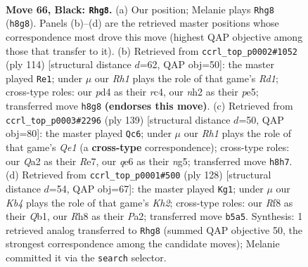 \documentclass[11pt]{article}
\begin{document}
\clearpage

\begin{figure}[p]\centering
\begin{subfigure}{0.46\textwidth}\centering
\resizebox{\linewidth}{!}{%
\newchessgame
\chessboard[
  setfen={5r1r/p5p1/4Q2p/1k1p3P/p2P2P1/4P2K/q6N/4b3 b - - 41 66},
  showmover=false,
  pgfstyle=straightmove, color=movearrow, markmove={h8-g8}
]}
\caption{}
\end{subfigure}\hfill
\begin{subfigure}{0.46\textwidth}\centering
\resizebox{\linewidth}{!}{%
\newchessgame
\chessboard[
  setfen={8/5pk1/3q2p1/3Pp2p/2r5/4QP1P/6P1/3R3K w - - 18 58},
  showmover=false,
  pgfstyle=straightmove, color=movearrow, markmove={d1-e1}
]}
\caption{}
\end{subfigure}
\\[4pt]
\begin{subfigure}{0.46\textwidth}\centering
\resizebox{\linewidth}{!}{%
\newchessgame
\chessboard[
  setfen={4q1k1/4r3/4p3/1p2QpN1/p6P/P2P2P1/1P3P1K/8 b - - 28 70},
  showmover=false,
  pgfstyle=straightmove, color=movearrow, markmove={e8-c6}
]}
\caption{}
\end{subfigure}\hfill
\begin{subfigure}{0.46\textwidth}\centering
\resizebox{\linewidth}{!}{%
\newchessgame
\chessboard[
  setfen={8/1r3pk1/1P4p1/2q4p/3p3P/pR4P1/P4P1K/1Q6 w - - 15 65},
  showmover=false,
  pgfstyle=straightmove, color=movearrow, markmove={h2-g1}
]}
\caption{}
\end{subfigure}
\caption{\textbf{Move 66, Black: \texttt{Rhg8}.} (a) Our position; Melanie plays \texttt{Rhg8} (\texttt{h8g8}). Panels (b)--(d) are the retrieved master positions whose correspondence most drove this move (highest QAP objective among those that transfer to it). (b) Retrieved from \texttt{ccrl\_top\_p0002\#1052} (ply 114) [structural distance $d$=62, QAP obj=50]: the master played \texttt{Re1}; under $\mu$ our \emph{Rh1} plays the role of that game's \emph{Rd1}; cross-type roles: our \emph{p}d4 as their \emph{r}c4, our \emph{n}h2 as their \emph{p}e5; transferred move \texttt{h8g8} \textbf{(endorses this move)}. (c) Retrieved from \texttt{ccrl\_top\_p0003\#2296} (ply 139) [structural distance $d$=50, QAP obj=80]: the master played \texttt{Qc6}; under $\mu$ our \emph{Rh1} plays the role of that game's \emph{Qe1} (a \textbf{cross-type} correspondence); cross-type roles: our \emph{Q}a2 as their \emph{R}e7, our \emph{q}e6 as their \emph{n}g5; transferred move \texttt{h8h7}. (d) Retrieved from \texttt{ccrl\_top\_p0001\#500} (ply 128) [structural distance $d$=54, QAP obj=67]: the master played \texttt{Kg1}; under $\mu$ our \emph{Kb4} plays the role of that game's \emph{Kh2}; cross-type roles: our \emph{R}f8 as their \emph{Q}b1, our \emph{R}h8 as their \emph{P}a2; transferred move \texttt{b5a5}. Synthesis: 1 retrieved analog transferred to \texttt{Rhg8} (summed QAP objective 50, the strongest correspondence among the candidate moves); Melanie committed it via the \texttt{search} selector.}
\label{fig:thought-m131}
\end{figure}
\end{document}
